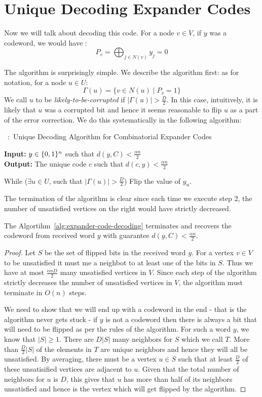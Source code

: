 \section{Unique Decoding Expander Codes}
Now we will talk about decoding this code. For a node $v \in V$, if $y$ was a codeword, we would have :
$$P_v = \bigoplus_{j \in N(v)} y_j = 0$$

The algorithm is surprisingly simple. We describe the algorithm first: as for notation, for a node $u \in U$:
$$\Gamma(u) = \{ v \in N(u) \mid P_v = 1 \}$$
We call $u$ to be \textit{likely-to-be-corrupted} if $|\Gamma(u)| > \frac{D}{2}$. In this case, intuitively, it is likely that $u$ was a corrupted bit and hence it seems reasonable to flip $u$ as a part of the error correction. We do this systematically in the following algorithm:

\begin{algorithm}
\caption{~:~Unique Decoding Algorithm for Combinatorial Expander Codes}
\label{alg:expander-code-decoding}
{\bf Input:} $y \in \{0,1\}^n$ such that $d(y,C) < \frac{\alpha n}{2}$ \\
{\bf Output:} The unique code $c$ such that $d(c,y) < \frac{\alpha n}{2}$
\begin{algorithmic}[1]
\State While ($\exists u \in U$, such that $|\Gamma(u)| > \frac{D}{2}$)
\State Flip the value of $y_u$.
\end{algorithmic}
\end{algorithm}

The termination of the algorithm is clear since each time we execute step 2, the number of unsatisfied vertices on the right would have strictly decreased. 

\begin{lemma}
The Algortihm~\ref{alg:expander-code-decoding} terminates and recovers the codeword from received word $y$ with guarantee $d(y,C) < \frac{\alpha n}{2}$.
\end{lemma}
\begin{proof}
Let $S$ be the set of flipped bits in the received word $y$. For a vertex $v \in V$ to be unsatisfied it must me a neighbot to at least one of the bits in $S$. Thus we have at most $\frac{\alpha n D}{2}$ many unsatisfied vertices in $V$. Since each step of the algorithm strictly decreases the number of unsatisfied vertices in $V$, the algorithm must terminate in $O(n)$ steps.

We need to show that we will end up with a codeword in the end - that is the algorithm never gets stuck - if $y$ is not a codeword then there is always a bit that will need to be flipped as per the rules of the algorithm. For such a word $y$, we know that $|S| \ge 1$. There are $D|S|$ many neighbors for $S$ which we call $T$. More than $\frac{D}{2}|S|$ of the elements in $T$ are unique neighbors and hence they will all be unsatisfied. By averaging, there must be a vertex $u \in S$ such that at least $\frac{D}{2}$ of these unsatisified vertices are adjacent to $u$. Given that the total number of neighbors for $u$ is $D$, this gives that $u$ has more than half of its neighbors unsatisfied and hence is the vertex which will get flipped by the algorithm.
\end{proof}


